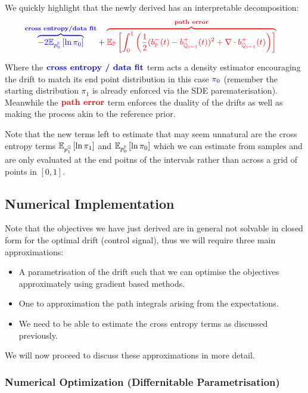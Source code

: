 \documentclass[a4paper,12pt,twoside,openright]{report}
\makeatletter
\theoremstyle{definition}
\def\mathcolor#1#{\@mathcolor{#1}}
\def\@mathcolor#1#2#3{%
  \protect\leavevmode
  \begingroup
    \color#1{#2}#3%
  \endgroup
}
\makeatother
\begin{document}
We quickly highlight that the newly derived has an interpretable  decomposition:
\begin{align*}
 \mathcolor{blue}{\overbrace{-2\E_{p^{\P}_0}\left[\log \pi_0 \right]}^{\textbf{cross entropy/data fit}}} &+ \mathcolor{red}{\overbrace{\E_{\P}\left[\int_0^1 \left(\frac{1}{2}(b_\P^{-}(t) - b_{\Q_{i-1}}^{+}(t))^2 + \nabla\cdot b^{+}_{\Q_{i-1}}(t) \right)\right] }^{\textbf{path error}}}
\end{align*}

Where the $\mathcolor{blue}{\textbf{cross entropy / data fit}}$ term acts a density estimator encouraging the drift to match its end point distribution in this case $\mathcolor{blue}{\pi_0}$ (remember the starting distribution $\pi_1$ is already enforced via the SDE parematerisation). Meanwhile the $\mathcolor{red}{\textbf{path error}}$ term enforces the duality of the drifts as well as making the process akin to the reference prior.

Note that the  new terms left to estimate that may seem unnatural are the cross entropy terms $\mathbb{E}_{p^{{\mathbb{Q}}}_1}\left[\operatorname{ln} \pi_1 \right]$ and $\mathbb{E}_{p^{{\mathbb{P}}}_0}\left[\operatorname{ln} \pi_0 \right]$ which we can estimate from samples and are only evaluated at the end poitns of the intervals rather than across a grid of points in $[0,1]$. 

\subsection{Numerical Implementation}

Note that the objectives we have just derived are in general not solvable in closed form for the optimal drift (control signal), thus we will require three main approximations:
\begin{itemize}
    \item A parametrisation of the drift such that we can optimise the objectives approximately using gradient based methods.
    \item One to approximation the path integrals arising from the expectations.
    \item We need to be able to estimate the cross entropy terms as discussed previously.
\end{itemize}

We will now proceed to discuss these approximations in more detail.
\subsubsection{Numerical Optimization (Differnitable Parametrisation)}
\end{document}
